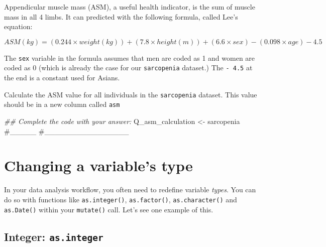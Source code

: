 \documentclass[
  letterpaper,
  DIV=11,
  numbers=noendperiod]{scrreprt}
\newenvironment{Shaded}{\begin{snugshade}}{\end{snugshade}}
\newcommand{\CommentTok}[1]{\textcolor[rgb]{0.37,0.37,0.37}{#1}}
\newcommand{\DocumentationTok}[1]{\textcolor[rgb]{0.37,0.37,0.37}{\textit{#1}}}
\newcommand{\NormalTok}[1]{\textcolor[rgb]{0.00,0.23,0.31}{#1}}
\newcommand{\OtherTok}[1]{\textcolor[rgb]{0.00,0.23,0.31}{#1}}
\begin{document}
\begin{tcolorbox}[enhanced jigsaw, titlerule=0mm, colback=white, left=2mm, breakable, opacitybacktitle=0.6, colbacktitle=quarto-callout-tip-color!10!white, colframe=quarto-callout-tip-color-frame, bottomtitle=1mm, opacityback=0, coltitle=black, arc=.35mm, toptitle=1mm, title=\textcolor{quarto-callout-tip-color}{\faLightbulb}\hspace{0.5em}{Practice}, leftrule=.75mm, toprule=.15mm, bottomrule=.15mm, rightrule=.15mm]

Appendicular muscle mass (ASM), a useful health indicator, is the sum of
muscle mass in all 4 limbs. It can predicted with the following formula,
called Lee's equation:

\[ASM(kg)= (0.244 \times weight(kg)) + (7.8 \times height(m)) + (6.6 \times sex) - (0.098 \times age) - 4.5\]

The \texttt{sex} variable in the formula assumes that men are coded as 1
and women are coded as 0 (which is already the case for our
\texttt{sarcopenia} dataset.) The \texttt{-\ 4.5} at the end is a
constant used for Asians.

Calculate the ASM value for all individuals in the \texttt{sarcopenia}
dataset. This value should be in a new column called \texttt{asm}

\begin{Shaded}
\begin{Highlighting}[]
\DocumentationTok{\#\# Complete the code with your answer:}
\NormalTok{Q\_asm\_calculation }\OtherTok{\textless{}{-}} 
\NormalTok{  sarcopenia }\CommentTok{\#\_\_\_\_\_}
  \CommentTok{\#\_\_\_\_\_\_\_\_\_\_\_\_\_\_\_\_}
\end{Highlighting}
\end{Shaded}

\end{tcolorbox}

\section{Changing a variable's type}\label{changing-a-variables-type}

In your data analysis workflow, you often need to redefine variable
\emph{types}. You can do so with functions like \texttt{as.integer()},
\texttt{as.factor()}, \texttt{as.character()} and \texttt{as.Date()}
within your \texttt{mutate()} call. Let's see one example of this.

\subsection{\texorpdfstring{Integer:
\texttt{as.integer}}{Integer: as.integer}}\label{integer-as.integer}
\end{document}
